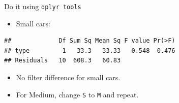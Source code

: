 \documentclass[ignorenonframetext,]{beamer}
\newenvironment{Shaded}{\begin{snugshade}}{\end{snugshade}}
\newcommand{\DataTypeTok}[1]{\textcolor[rgb]{0.13,0.29,0.53}{#1}}
\newcommand{\KeywordTok}[1]{\textcolor[rgb]{0.13,0.29,0.53}{\textbf{#1}}}
\newcommand{\NormalTok}[1]{#1}
\newcommand{\OperatorTok}[1]{\textcolor[rgb]{0.81,0.36,0.00}{\textbf{#1}}}
\newcommand{\StringTok}[1]{\textcolor[rgb]{0.31,0.60,0.02}{#1}}
\providecommand{\tightlist}{%
  \setlength{\itemsep}{0pt}\setlength{\parskip}{0pt}}
\begin{document}
\begin{frame}[fragile]{Do it using \texttt{dplyr\ tools}}
\protect\hypertarget{do-it-using-dplyr-tools}{}

\begin{itemize}
\tightlist
\item
  Small cars:
\end{itemize}

\begin{Shaded}
\end{Shaded}

\begin{verbatim}
##             Df Sum Sq Mean Sq F value Pr(>F)
## type         1   33.3   33.33   0.548  0.476
## Residuals   10  608.3   60.83
\end{verbatim}

\begin{itemize}
\item
  No filter difference for small cars.
\item
  For Medium, change \texttt{S} to \texttt{M} and repeat.
\end{itemize}

\end{frame}
\end{document}
